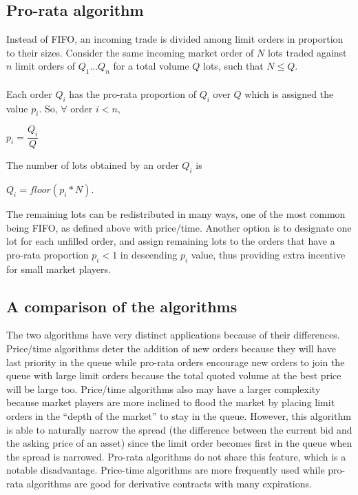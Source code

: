 \documentclass{article}
\begin{document}
\subsection{Pro-rata algorithm}
Instead of FIFO, an  incoming trade is divided among limit orders in proportion to their sizes. Consider the same incoming market order of $N$ lots traded against $n$ limit orders of $Q_1\ldots Q_n$ for a total volume $Q$ lots, such that $N \leq Q$.\\\\
Each order $Q_i$ has the pro-rata proportion of $Q_i$ over $Q$ which is assigned the value $p_i$. So, $\forall$ order $i < n$, 
\begin{center}
    $p_i = \dfrac{Q_i}{Q}$
\end{center}
The number of lots obtained by an order $Q_i$ is 
\begin{center}
    $Q_i = floor(p_i * N)$.
\end{center}
 The remaining lots can be redistributed in many ways, one of the most common being FIFO, as defined above with price/time. Another option is to designate one lot for each unfilled order, and assign remaining lots to the orders that have a pro-rata proportion $p_i < 1$ in descending $p_i$ value, thus providing extra incentive for small market players. 

\subsection{A comparison of the algorithms}
The two algorithms have very distinct applications because of their differences. Price/time algorithms deter the addition of new orders because they will have last priority in the queue while pro-rata orders encourage new orders to join the queue with large limit orders because the total quoted volume at the best price will be large too. Price/time algorithms also may have a larger complexity because market players are more inclined to flood the market by placing limit orders in the “depth of the market” to stay in the queue. However, this algorithm is able to naturally narrow the spread (the difference between the current bid and the asking price of an asset) since the limit order becomes first in the queue when the spread is narrowed. Pro-rata algorithms do not share this feature, which is a notable disadvantage. Price-time algorithms are more frequently used while pro-rata algorithms are good for derivative contracts with many expirations. 
\end{document}

